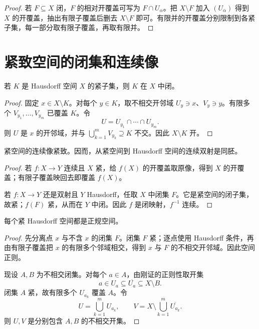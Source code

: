 \begin{proof}
若 \(F\subseteq X\) 闭，\(F\) 的相对开覆盖可写为 \(F\cap U_\alpha\)。把 \(X\setminus F\) 加入 \((U_\alpha)\) 得到 \(X\) 的开覆盖，抽出有限子覆盖后删去 \(X\setminus F\) 即可。有限并的开覆盖分别限制到各紧子集，每一部分取有限子覆盖，再取有限并。
\end{proof}

\section{紧致空间的闭集和连续像}

\begin{theorem}
\label{thm:compact-subset-hausdorff-closed}
若 \(K\) 是 Hausdorff 空间 \(X\) 的紧子集，则 \(K\) 在 \(X\) 中闭。
\end{theorem}

\begin{proof}
固定 \(x\in X\setminus K\)。对每个 \(y\in K\)，取不相交开邻域
\(U_y\ni x\)、\(V_y\ni y\)。有限多个 \(V_{y_1},\ldots,V_{y_m}\) 已覆盖 \(K\)。令
\[
 U=U_{y_1}\cap\cdots\cap U_{y_m}.
\]
则 \(U\) 是 \(x\) 的开邻域，并与 \(\bigcup_{k=1}^mV_{y_k}\supseteq K\) 不交。因此 \(X\setminus K\) 开。
\end{proof}

\begin{theorem}[紧致性的映射性质]
\label{thm:compact-continuous-image}
紧空间的连续像紧致。因而，从紧空间到 Hausdorff 空间的连续双射是同胚。
\end{theorem}

\begin{proof}
若 \(f:X\to Y\) 连续且 \(X\) 紧，给 \(f(X)\) 的开覆盖取原像，得到 \(X\) 的开覆盖；有限子覆盖映回去即覆盖 \(f(X)\)。

若 \(f:X\to Y\) 还是双射且 \(Y\) Hausdorff，任取 \(X\) 中闭集 \(F\)。它是紧空间的闭子集，故紧；\(f(F)\) 紧，从而在 \(Y\) 中闭。因此 \(f\) 是闭映射，\(f^{-1}\) 连续。
\end{proof}

\begin{theorem}
\label{thm:compact-hausdorff-normal}
每个紧 Hausdorff 空间都是正规空间。
\end{theorem}

\begin{proof}
先分离点 \(x\) 与不含 \(x\) 的闭集 \(F\)。闭集 \(F\) 紧；逐点使用 Hausdorff 条件，再由有限子覆盖把 \(x\) 的有限多个邻域相交，得到 \(x\) 与 \(F\) 的不相交开邻域。因此空间正则。

现设 \(A,B\) 为不相交闭集。对每个 \(a\in A\)，由刚证的正则性取开集
\[
 a\in U_a\subseteq\overline{U_a}\subseteq X\setminus B.
\]
闭集 \(A\) 紧，故有限多个 \(U_{a_k}\) 覆盖 \(A\)。令
\[
 U=\bigcup_{k=1}^mU_{a_k},\qquad
 V=X\setminus\bigcup_{k=1}^m\overline{U_{a_k}}.
\]
则 \(U,V\) 是分别包含 \(A,B\) 的不相交开集。
\end{proof}

